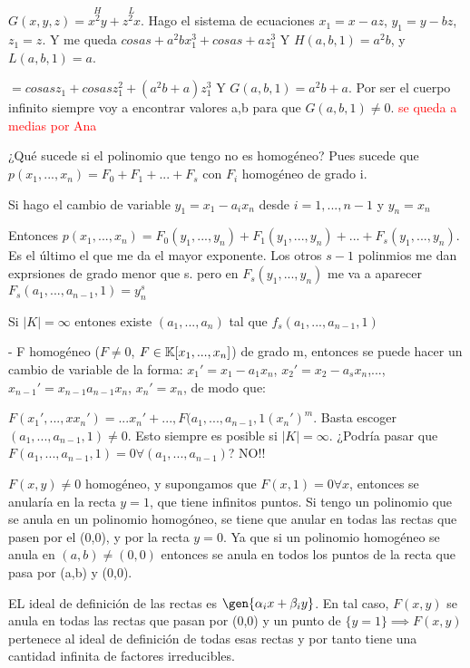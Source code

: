 \begin{example}
 $G(x,y,z)=\stackrel{H}{x^2y}+\stackrel{L}{z^2x}$. Hago el sistema de ecuaciones $x_1=x-az$, $y_1=y-bz$, $z_1=z$. Y me queda $cosas + a^2b x_1^3+cosas+ az_1^3$ Y $H(a,b,1)=a^2b$, y $L(a,b,1)=a$.

 $= cosas z_1+ cosas z_1^2+(a^2b+a)z_1^3$ Y $G(a,b,1)=a^2b+a$. Por ser el cuerpo infinito siempre voy a encontrar valores a,b para que $G(a,b,1) \neq 0$. \textcolor{red}{se queda a medias por Ana}
\end{example}


¿Qué sucede si el polinomio que tengo no es homogéneo? Pues sucede que $p(x_1,...,x_n)=F_0+F_1+...+F_s$ con $F_i$ homogéneo de grado i.

Si hago el cambio de variable $y_1=x_1-a_ix_n$ desde $i=1,...,n-1$ y $y_n=x_n$

Entonces $p(x_1,...,x_n)=F_0(y_1,...,y_n)+F_1(y_1,...,y_n)+...+F_s(y_1,...,y_n)$. Es el último el que me da el mayor exponente. Los otros $s-1$ polinmios me dan exprsiones de grado menor que s. pero en $F_s(y_1,...,y_n)$ me va a aparecer $F_s(a_{1},...,a_{n-1}, 1) = y_n^s$

Si $|K|= \infty$ entones existe $(a_1,...,a_n)$ tal que  $f_s(a_1,...,a_{n-1}, 1)$


- F homogéneo ($F \neq 0$, $F \in \mathbb{K}[x_1,...,x_n]$) de grado m, entonces se puede hacer un cambio de variable de la forma:
$x_1'=x_1-a_1x_n$, $x_2'=x_2-a_sx_n$,...,$x_{n-1}'=x_{n-1}a_{n-1}x_n$, $x_n'=x_n$, de modo que:

$F(x_1',...,xx_n')=... x_n'+...,F(a_1,...,a_{n-1},1(x_n')^m$. Basta escoger $(a_1,...,a_{n-1},1)\neq 0$. Esto siempre es posible si $|K|=\infty$. ¿Podría pasar que $F(a_1,...,a_{n-1},1)=0 \forall(a_1,...,a_{n-1})$? NO!! 

$F(x,y)\neq 0$ homogéneo, y supongamos que $F(x,1)=0 \forall x$, entonces se anularía en la recta $y=1$, que tiene infinitos puntos. Si tengo un polinomio que se anula en un polinomio homogóneo, se tiene que anular en todas las rectas que pasen por el (0,0), y por la recta $y=0$. Ya que si un polinomio homogéneo se anula en $(a,b)\neq (0,0)$ entonces se anula en todos los puntos de la recta que pasa por (a,b) y (0,0). 

EL ideal de definición de las rectas es $\gen{\alpha_ix+\beta_iy}$. En tal caso, $F(x,y)$ se anula en todas las rectas que pasan por (0,0) y un punto de $\{ y=1 \} \implies F(x,y)$ pertenece al ideal de definición de todas esas rectas y por tanto tiene una cantidad infinita de factores irreducibles. 

